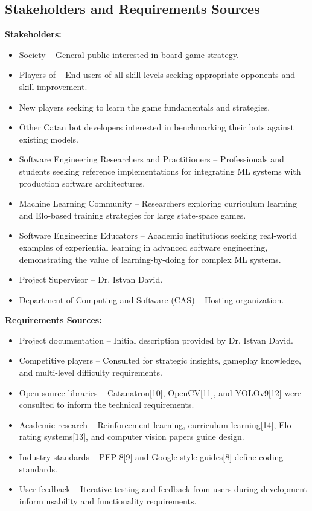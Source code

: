 \documentclass{article}
\begin{document}
\subsection{Stakeholders and Requirements Sources}\label{subsec:stakeholders-and-requirements-sources}
\textbf{Stakeholders:}
\begin{itemize}
    \item Society – General public interested in board game strategy.
    \item Players of \emph{\Catan{}} – End-users of all skill levels seeking appropriate opponents and skill improvement.
    \item New players seeking to learn the game fundamentals and strategies.
    \item Other Catan bot developers interested in benchmarking their bots against existing models.
    \item Software Engineering Researchers and Practitioners – Professionals and students seeking reference implementations for integrating ML systems with production software architectures.
    \item Machine Learning Community – Researchers exploring curriculum learning and Elo-based training strategies for large state-space games.
    \item Software Engineering Educators – Academic institutions seeking real-world examples of experiential learning in advanced software engineering, demonstrating the value of learning-by-doing for complex ML systems.
    \item Project Supervisor – Dr. Istvan David.
    \item Department of Computing and Software (CAS) – Hosting organization.
\end{itemize}

\noindent\textbf{Requirements Sources:}
\begin{itemize}
    \item Project documentation – Initial description provided by Dr. Istvan David.
    \item Competitive \emph{\Catan{}} players – Consulted for strategic insights, gameplay knowledge, and multi-level difficulty requirements.
    \item Open-source libraries – Catanatron[10], OpenCV[11], and YOLOv9[12] were consulted to inform the technical requirements.
    \item Academic research – Reinforcement learning, curriculum learning[14], Elo rating systems[13], and computer vision papers guide \AI{} design.
    \item Industry standards – PEP 8[9] and Google style guides[8] define coding standards.
    \item User feedback – Iterative testing and feedback from users during development inform usability and functionality requirements.
\end{itemize}
\end{document}
